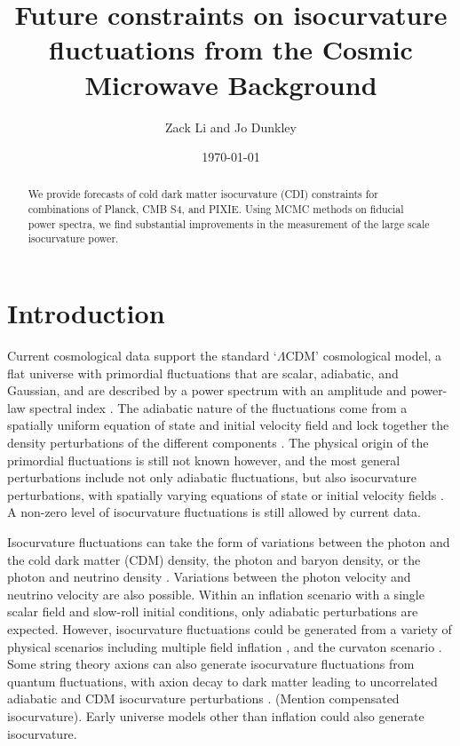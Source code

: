 \documentclass{emulateapj}
\newcommand{\LCDM}   {$\Lambda$CDM}
\begin{document}
\title{Future constraints on isocurvature fluctuations from the Cosmic Microwave Background}
\author{Zack Li and Jo Dunkley}
\date{\today}
{}


\begin{abstract}
We provide forecasts of cold dark matter isocurvature (CDI) constraints for combinations of Planck, CMB S4, and PIXIE. Using MCMC methods on fiducial power spectra, we find substantial improvements in the measurement of the large scale isocurvature power.
\end{abstract}

\section{Introduction}

Current cosmological data support the standard `\LCDM' cosmological model, a flat universe with primordial fluctuations that are scalar, adiabatic, and Gaussian, and are described by a power spectrum with an amplitude and power-law spectral index \citep{planck}. The adiabatic nature of the fluctuations come from a spatially uniform equation of state and initial velocity field and lock together the density perturbations of the different components \citep{planckXXII:2013}. The physical origin of the primordial fluctuations is still not known however, and the most general perturbations include not only adiabatic fluctuations, but also isocurvature perturbations, with spatially varying equations of state or initial velocity fields \citep{adiab}. A non-zero level of isocurvature fluctuations is still allowed by current data.

Isocurvature fluctuations can take the form of variations between the photon and the cold dark matter (CDM) density, the photon and baryon density, or the photon and neutrino density \citep{moodley/bucher/turok:2000}. Variations between the photon velocity and neutrino velocity are also possible. Within an inflation scenario with a single scalar field and slow-roll initial conditions, only adiabatic perturbations are expected. However, isocurvature fluctuations could be generated from a variety of physical scenarios including multiple field inflation \citep{langlois:1999}, and the curvaton scenario
\citep{baumann/etal:2009}. Some string theory axions can also generate isocurvature fluctuations from quantum fluctuations, with axion decay to dark matter leading to uncorrelated adiabatic and CDM isocurvature perturbations \cite{axion}. (Mention compensated isocurvature). Early universe models other than inflation could also generate isocurvature.
\end{document}
